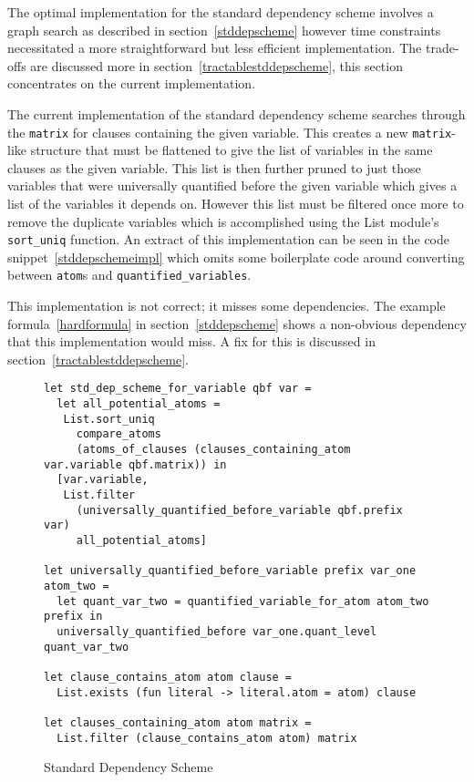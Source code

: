 The optimal implementation for the standard dependency scheme involves a graph search as described in section~\ref{stddepscheme} however time constraints necessitated a more straightforward but less efficient implementation. The trade-offs are discussed more in section~\ref{tractablestddepscheme}, this section concentrates on the current implementation.

The current implementation of the standard dependency scheme searches through the \texttt{matrix} for clauses containing the given variable. This creates a new \texttt{matrix}-like structure that must be flattened to give the list of variables in the same clauses as the given variable. This list is then further pruned to just those variables that were universally quantified before the given variable which gives a list of the variables it depends on. However this list must be filtered once more to remove the duplicate variables which is accomplished using the List module's \texttt{sort\_uniq} function. An extract of this implementation can be seen in the code snippet~\ref{stddepschemeimpl} which omits some boilerplate code around converting between \texttt{atom}s and \texttt{quantified\_variables}.

This implementation is not correct; it misses some dependencies. The example formula~\ref{hardformula} in section~\ref{stddepscheme} shows a non-obvious dependency that this implementation would miss. A fix for this is discussed in section~\ref{tractablestddepscheme}.

\begin{figure}[h]
\caption{Standard Dependency Scheme}
\begin{CenteredBox}
\begin{lstlisting}[language=caml, label=stddepschemeimpl]
let std_dep_scheme_for_variable qbf var =
  let all_potential_atoms =
   List.sort_uniq
     compare_atoms
     (atoms_of_clauses (clauses_containing_atom var.variable qbf.matrix)) in
  [var.variable,
   List.filter
     (universally_quantified_before_variable qbf.prefix var)
     all_potential_atoms]

let universally_quantified_before_variable prefix var_one atom_two =
  let quant_var_two = quantified_variable_for_atom atom_two prefix in
  universally_quantified_before var_one.quant_level quant_var_two

let clause_contains_atom atom clause =
  List.exists (fun literal -> literal.atom = atom) clause

let clauses_containing_atom atom matrix =
  List.filter (clause_contains_atom atom) matrix
\end{lstlisting}
\end{CenteredBox}
\end{figure}

